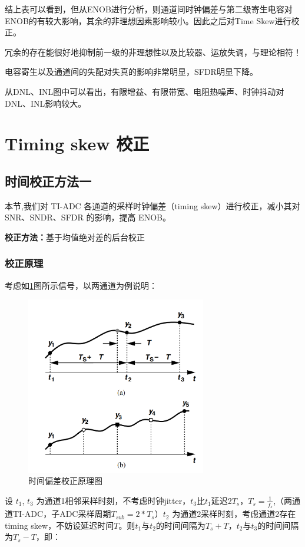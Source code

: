 \documentclass[cs4size,a4paper]{ctexart}
\numberwithin{equation}{section}
\numberwithin{table}{section}
\numberwithin{figure}{section}
\begin{document}
		结上表可以看到，但从ENOB进行分析，则通道间时钟偏差与第二级寄生电容对ENOB的有较大影响，其余的非理想因素影响较小。因此之后对Time Skew进行校正。

		冗余的存在能很好地抑制前一级的非理想性以及比较器、运放失调，与理论相符！

		电容寄生以及通道间的失配对失真的影响非常明显，SFDR明显下降。

		从DNL、INL图中可以看出，有限增益、有限带宽、电阻热噪声、时钟抖动对DNL、INL影响较大。
\newpage
		\section{Timing skew 校正}
		\subsection{时间校正方法一}
		\noindent
		本节,我们对 TI-ADC 各通道的采样时钟偏差（timing skew）进行校正，减小其对 SNR、SNDR、SFDR 的影响，提高 ENOB。
		
		\noindent
		\textbf{校正方法：}基于均值绝对差的后台校正
		
		\subsubsection{校正原理}
		
		\noindent
		考虑如\ref{fig:ti1}图所示信号，以两通道为例说明：
		\begin{figure}[H]
			\centering
			\includegraphics[width=0.7\textwidth]{figure/ti1.png}
			\caption{时间偏差校正原理图} \label{fig:ti1}
		\end{figure}
		
		
		设 $t_1$, $t_3$ 为通道1相邻采样时刻，不考虑时钟jitter，$t_3$比$t_1$延迟2$T_s$，$T_s=\frac{1}{f
		_s}$,（两通道TI-ADC，子ADC采样周期$T_{sub}=2*T_s$）$t_2$ 为通道2采样时刻，考虑通道2存在timing skew，不妨设延迟时间$T$。则$t_1$与$t_2$的时间间隔为$T_s+T$，$t_2$与$t_3$的时间间隔为$T_s-T$，即：
		
\end{document}
